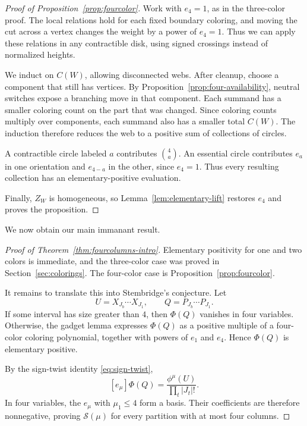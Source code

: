 \documentclass[11pt]{article}
\theoremstyle{definition}
\theoremstyle{remark}
\begin{document}
\begin{proof}[Proof of Proposition~\ref{prop:fourcolor}]
 Work with $e_4=1$,
as in the three-color proof. The local relations
hold for each fixed boundary coloring, and moving
the cut across a vertex changes the weight by
a power of $e_4=1$. Thus we can apply these
relations in any contractible disk, using signed
crossings instead of normalized heights.

We induct on $C(W)$, allowing disconnected webs.
After cleanup, choose a component that still has vertices.
By Proposition~\ref{prop:four-availability}, neutral switches
expose a branching move in that component. Each summand has
a smaller coloring count on the part that was changed.
Since coloring counts multiply over components, each
summand also has a smaller total $C(W)$. The induction
therefore reduces the web to a positive sum of collections
of circles.

A contractible circle labeled $a$ contributes
$\binom4a$. An essential circle contributes
$e_a$ in one orientation and $e_{4-a}$ in the
other, since $e_4=1$. Thus every resulting
collection has an elementary-positive evaluation.


Finally, $Z_W$ is homogeneous, so
Lemma~\ref{lem:elementary-lift} restores $e_4$
and proves the proposition.
\end{proof}

We now obtain our main immanant result.

\begin{proof}[Proof of Theorem~\ref{thm:fourcolumns-intro}]
Elementary positivity for one and two colors is
immediate, and the three-color case was proved
in Section~\ref{sec:colorings}. The four-color
case is Proposition~\ref{prop:fourcolor}.

It remains to translate this into Stembridge's
conjecture. Let
\[
U=X_{J_b}\cdots X_{J_1},\qquad
Q=P_{J_b}\cdots P_{J_1}.
\]
If some interval has size greater than $4$,
then $\Phi(Q)$ vanishes in four variables.
Otherwise, the gadget lemma expresses $\Phi(Q)$
as a positive multiple of a four-color coloring
polynomial, together with powers of $e_1$ and
$e_4$. Hence $\Phi(Q)$ is elementary positive.

By the sign-twist identity \eqref{eq:sign-twist},
\[
[e_\mu]\Phi(Q)
=\frac{\phi^\mu(U)}{\prod_t|J_t|!}.
\]
In four variables, the $e_\mu$ with $\mu_1\le4$
form a basis. Their coefficients are therefore
nonnegative, proving $\mathcal S(\mu)$ for
every partition with at most four columns.
\end{proof}
\end{document}
